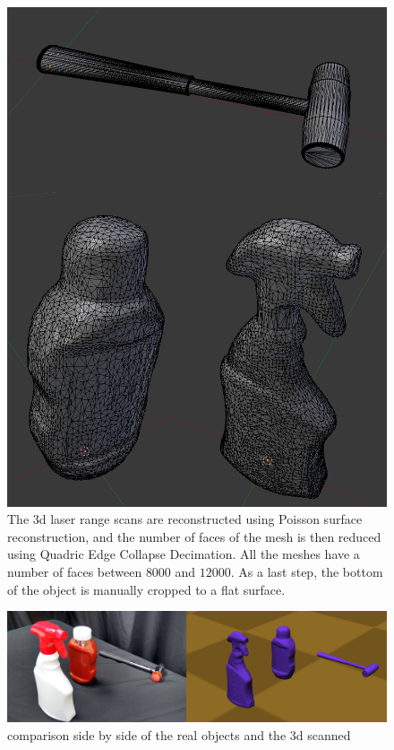 \begin{figure}[!hbt]
\begin{center}
        \includegraphics[width=0.6\columnwidth]     {images/ssoch/meshes}
        \caption{The 3d laser range scans are reconstructed using Poisson surface reconstruction, and the number of faces of the mesh is then reduced using Quadric Edge Collapse Decimation. All the meshes have a number of faces between $8000$ and $12000$. As a last step, the bottom of the object is manually cropped to a flat surface.}
        \label{meshes}
        \end{center}
\end{figure}

\begin{figure}[!hbt]
\begin{center}
        \includegraphics[width=0.95\columnwidth]     {images/ssoch/objects}
        \caption{comparison side by side of the real objects and the 3d scanned}
        \label{objects}
        \end{center}
\end{figure}



